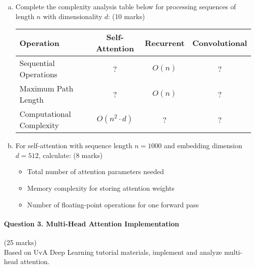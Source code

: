 \documentclass[12pt]{article}
\newcommand{\shortanswer}{\vspace{2cm}}          %
\newcommand{\mediumanswer}{\vspace{3cm}}         %
\begin{document}
\begin{enumerate}[(a)]
    \item Complete the complexity analysis table below for processing sequences of length $n$ with dimensionality $d$: \hfill (10 marks)
    
    \begin{center}
    \begin{tabular}{|l|c|c|c|}
    \hline
    \textbf{Operation} & \textbf{Self-Attention} & \textbf{Recurrent} & \textbf{Convolutional} \\
    \hline
    Sequential Operations & ? & $O(n)$ & ? \\
    \hline
    Maximum Path Length & ? & $O(n)$ & ? \\
    \hline
    Computational Complexity & $O(n^2 \cdot d)$ & ? & ? \\
    \hline
    \end{tabular}
    \end{center}
    
    \shortanswer
    
    \item For self-attention with sequence length $n = 1000$ and embedding dimension $d = 512$, calculate: \hfill (8 marks)
    \begin{itemize}
        \item Total number of attention parameters needed
        \item Memory complexity for storing attention weights
        \item Number of floating-point operations for one forward pass
    \end{itemize}
    
    \mediumanswer
\end{enumerate}

\newpage
\paragraph{Question 3. Multi-Head Attention Implementation}\hfill (25 marks)\\
Based on UvA Deep Learning tutorial materials, implement and analyze multi-head attention.
\end{document}
